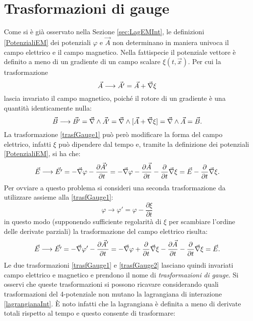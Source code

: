 \section{Trasformazioni di gauge}\label{sec:gauge}
Come si è già osservato nella Sezione \ref{sec:LagEMInt}, le definizioni \eqref{PotenzialiEM} dei potenziali $\varphi$ e $\vec A$ non determinano in maniera univoca il campo elettrico e il campo magnetico. Nella fattispecie il potenziale vettore è definito a meno di un gradiente di un campo scalare $\xi(t,\vec x)$. Per cui la trasformazione
\begin{equation}
     \vec{A}\longrightarrow\vec {A'}=\vec A + \vec{\nabla} \xi \label{trasfGauge1}
\end{equation}
lascia invariato il campo magnetico, poiché il rotore di un gradiente è una quantità identicamente nulla: 
\begin{equation*}
    \vec B\longrightarrow\vec{B'}=\vec{\nabla}\wedge\vec {A'}=\vec{\nabla}\wedge[\vec A + \vec{\nabla} \xi]=\vec{\nabla}\wedge\vec A =\vec B.
\end{equation*}
La trasformazione \eqref{trasfGauge1} può però modificare la forma del campo elettrico, infatti $\xi$ può dipendere dal tempo e, tramite la definizione dei potenziali \eqref{PotenzialiEM}, si ha che:
\begin{equation*}
    \vec E\longrightarrow\vec{E'}=-\vec{\nabla} \varphi-\frac{\partial\vec A'}{\partial t}=-\vec{\nabla} \varphi-\frac{\partial\vec A}{\partial t}-\frac{\partial}{\partial t}\vec{\nabla}\xi=\vec{E}-\frac{\partial}{\partial t}\vec{\nabla}\xi.
\end{equation*}
Per ovviare a questo problema si consideri una seconda trasformazione da utilizzare assieme alla \eqref{trasfGauge1}:
\begin{equation}
    \varphi \longrightarrow \varphi'=\varphi-\frac{\partial\xi}{\partial t}
    \label{trasfGauge2}
\end{equation}
in questo modo (supponendo sufficiente regolarità di $\xi$ per scambiare l'ordine delle derivate parziali) la trasformazione del campo elettrico risulta:
\begin{equation*}
    \vec E\longrightarrow\vec{E'}=-\vec{\nabla} \varphi'-\frac{\partial\vec A'}{\partial t}=-\vec{\nabla} \varphi+\frac{\partial}{\partial t}\vec{\nabla}\xi-\frac{\partial\vec A}{\partial t}-\frac{\partial}{\partial t}\vec{\nabla}\xi=\vec{E}.
\end{equation*}
Le due trasformazioni \eqref{trasfGauge1} e \eqref{trasfGauge2} lasciano quindi invariati campo elettrico e magnetico e prendono il nome di \emph{trasformazioni di gauge}. Si osservi che queste trasformazioni si possono ricavare considerando quali trasformazioni del 4-potenziale non mutano la lagrangiana di interazione \eqref{lagrangianaInt}. È noto infatti che la lagrangiana è definita a meno di derivate totali rispetto al tempo e questo consente di trasformare:
